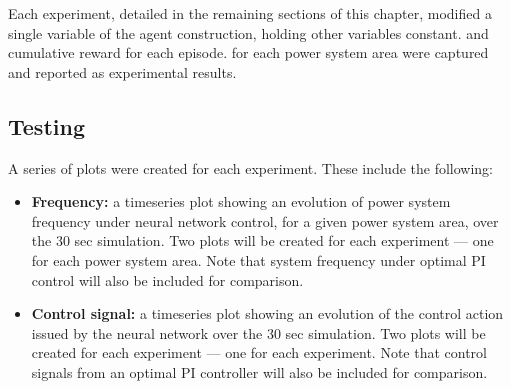 Each experiment, detailed in the remaining sections of this chapter, modified a single variable of the agent construction, holding other variables constant. and cumulative reward for each episode. for each power system area were captured and reported as experimental results.




\subsection{Testing}
A series of plots were created for each experiment. These include the following:
\begin{itemize}
	\item \textbf{Frequency:} a timeseries plot showing an evolution of power system frequency under neural network control, for a given power system area, over the 30 sec simulation. Two plots will be created for each experiment --- one for each power system area. Note that system frequency under optimal PI control will also be included for comparison.
	\item \textbf{Control signal:} a timeseries plot showing an evolution of the control action issued by the neural network over the 30 sec simulation. Two plots will be created for each experiment --- one for each experiment. Note that control signals from an optimal PI controller will also be included for comparison.
\end{itemize}
